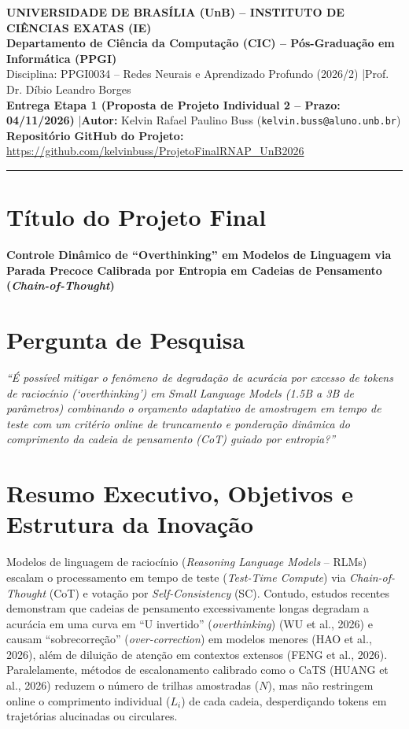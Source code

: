 \documentclass[9pt,a4paper]{extarticle}
\begin{document}
\begin{center}
    {\normalsize\bfseries\color{unbblue} UNIVERSIDADE DE BRASÍLIA (UnB) -- INSTITUTO DE CIÊNCIAS EXATAS (IE)}\\
    {\small\bfseries Departamento de Ciência da Computação (CIC) -- Pós-Graduação em Informática (PPGI)}\\
    {\footnotesize Disciplina: PPGI0034 -- Redes Neurais e Aprendizado Profundo (2026/2) \quad|\quad Prof. Dr. Díbio Leandro Borges}\\
    {\footnotesize \textbf{Entrega Etapa 1 (Proposta de Projeto Individual 2 -- Prazo: 04/11/2026)} \quad|\quad \textbf{Autor:} Kelvin Rafael Paulino Buss (\texttt{kelvin.buss@aluno.unb.br})}\\
    {\footnotesize \textbf{Repositório GitHub do Projeto:} \url{https://github.com/kelvinbuss/ProjetoFinalRNAP_UnB2026}}
\end{center}
\vspace{-5pt}
\noindent\textcolor{unbgreen}{\rule{\linewidth}{1.1pt}}
\vspace{-7pt}

\section{Título do Projeto Final}
\textbf{Controle Dinâmico de ``Overthinking'' em Modelos de Linguagem via Parada Precoce Calibrada por Entropia em Cadeias de Pensamento (\textit{Chain-of-Thought})}

\section{Pergunta de Pesquisa}
\textit{``É possível mitigar o fenômeno de degradação de acurácia por excesso de tokens de raciocínio (`overthinking') em Small Language Models (1.5B a 3B de parâmetros) combinando o orçamento adaptativo de amostragem em tempo de teste com um critério online de truncamento e ponderação dinâmica do comprimento da cadeia de pensamento (CoT) guiado por entropia?''}

\section{Resumo Executivo, Objetivos e Estrutura da Inovação}
Modelos de linguagem de raciocínio (\textit{Reasoning Language Models} -- RLMs) escalam o processamento em tempo de teste (\textit{Test-Time Compute}) via \textit{Chain-of-Thought} (CoT) e votação por \textit{Self-Consistency} (SC). Contudo, estudos recentes demonstram que cadeias de pensamento excessivamente longas degradam a acurácia em uma curva em ``U invertido'' (\textit{overthinking}) (WU et al., 2026) e causam ``sobrecorreção'' (\textit{over-correction}) em modelos menores (HAO et al., 2026), além de diluição de atenção em contextos extensos (FENG et al., 2026). Paralelamente, métodos de escalonamento calibrado como o CaTS (HUANG et al., 2026) reduzem o número de trilhas amostradas ($N$), mas não restringem online o comprimento individual ($L_i$) de cada cadeia, desperdiçando tokens em trajetórias alucinadas ou circulares.
\end{document}
